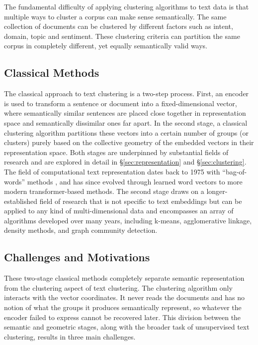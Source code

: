 \documentclass[11pt,a4paper,oneside]{report}
\begin{document}
The fundamental difficulty of applying clustering algorithms to text data is that multiple ways to cluster a corpus can make sense semantically. The same collection of documents can be clustered by different factors such as intent, domain, topic and sentiment. These clustering criteria can partition the same corpus in completely different, yet equally semantically valid ways.

\subsection{Classical Methods}

The classical approach to text clustering is a two-step process. First, an encoder is used to transform a sentence or document into a fixed-dimensional vector, where  semantically similar sentences are placed close together in representation space and semantically dissimilar ones far apart. In the second stage, a classical clustering algorithm partitions these vectors into a certain number of groups (or clusters) purely based on the collective geometry of the embedded vectors in their representation space. Both stages are underpinned by substantial fields of research and are explored in detail in \S\ref{sec:representation} and \S\ref{sec:clustering}. The field of computational text representation dates back to 1975 with ``bag-of-words'' methods \citep{salton1975vector}, and has since evolved through learned word vectors to more modern transformer-based methods. The second stage draws on a longer-established field of research that is not specific to text embeddings but can be applied to any kind of multi-dimensional data and encompasses an array of algorithms developed over many years, including k-means, agglomerative linkage, density methods, and graph community detection.

\subsection{Challenges and Motivations}

These two-stage classical methods completely separate semantic representation from the clustering aspect of text clustering. The clustering algorithm only interacts with the vector coordinates. It never reads the documents and has no notion of what the groups it produces semantically represent, so whatever the encoder failed to express cannot be recovered later. This division between the semantic and geometric stages, along with the broader task of unsupervised text clustering, results in three main challenges.
\end{document}
